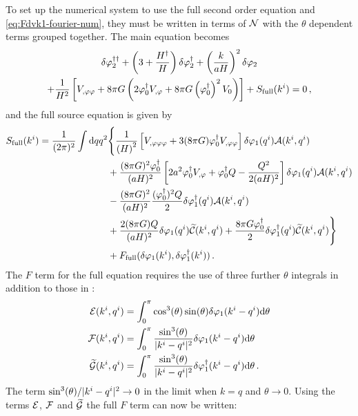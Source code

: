 To set up the numerical system to use the full second order equation
 and \eqref{eq:Fdvk1-fourier-num}, they must be written in
terms of $\mathcal{N}$ with the $\theta$ dependent terms grouped together. The main equation
becomes
\begin{multline}
 \label{eq:fullso-res}
\ddN{\dvp2} + \left(3 + \frac{\dN{H}}{H}\right) \dN{\dvp2} +
\left(\frac{k}{aH}\right)^2 \dvp2 \\
% 
+ \frac{1}{H^2}\left[ \Upp + 8\pi G\left(2\dN{\vp_0}\Uphi + 8\pi G
\left(\dN{\vp_0}\right)^2 \U \right)\right] 
% 
+ S_\mathrm{full}(\kvi) = 0\,,
\end{multline}
% 
and the full source equation is given by
% 
\begin{align}
\label{eq:fullsrc-res}
S_\mathrm{full}(\kvi) = \frac{1}{(2\pi)^2}\int \d q q^2 &\Bigg\{ 
% 
\frac{1}{\left(H\right)^2} \left[ \Uppp + 3(8\pi G)\dN{\vp_0}\Upp\right]
 \dvp1(\qvi) \A(\kvi, \qvi) \nonumber \\
% 
&+\frac{(8\pi G)^2 \dN{\vp_0}}{(aH)^2}\left[ 2a^2\dN{\vp_0}\Uphi +\dN{\vp_0}Q
-\frac{Q^2}{2(aH)^2}\right] \dvp1(\qvi) \A(\kvi, \qvi) \nonumber \\
% 
&- \frac{(8\pi G)^2}{(aH)^2}\frac{(\dN{\vp_0})^2 Q}{2} \dN{\dvp1}(\qvi)
\A(\kvi, \qvi) \nonumber \\
% 
&+ \frac{2(8\pi G)Q}{(aH)^2} \dvp1(\qvi)\wt{\C}(\kvi, \qvi) 
% 
+ \frac{8\pi G \dN{\vp_0}}{2} \dN{\dvp1}(\qvi) \wt{\C}(\kvi, \qvi) \Bigg\} \nonumber
\\
% 
&+ F_\mathrm{full}(\dvp1(\kvi), \dN{\dvp1}(\kvi))\,.
\end{align}
% 
The $F$ term for the full equation requires the use of three further $\theta$
integrals in addition to those in :
% 
\begin{align}
\label{eq:efg-terms-res}
 \E(\kvi, \qvi) &= \int_0^\pi \cos^3(\theta) \sin(\theta) \dvp1(\kvi-\qvi)\d \theta
\nonumber \\
% 
\F(\kvi, \qvi) &= \int_0^\pi \frac{\sin^3(\theta)}{|\kvi-\qvi|^2} \dvp1(\kvi-\qvi)\d
\theta
\nonumber \\
% 
\wt{\G}(\kvi, \qvi) &= \int_0^\pi \frac{\sin^3(\theta)}{|\kvi-\qvi|^2}
\dN{\dvp1}(\kvi-\qvi)\d \theta \,.
\end{align}
% 
The term $\sin^3(\theta)/|k^i-q^i|^2 \rightarrow 0$ in the limit when $k=q$ and
$\theta\rightarrow 0$.
% 
Using the terms $\mathcal{E}$, $\mathcal{F}$ and $\widetilde{\mathcal{G}}$ the full $F$ term can now be written:
